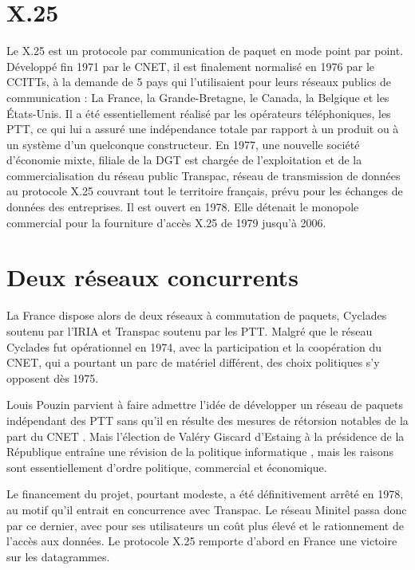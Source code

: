 \documentclass[12pt]{report}
\begin{document}
\section{X.25}

Le X.25 est un protocole par communication de paquet en mode point par point\cite{wikix25}. Développé fin 1971 par le \gls{CNET}, il est finalement normalisé en 1976 par le \glspl{CCITT}, à la demande de 5 pays qui l'utilisaient pour leurs réseaux publics de communication : La France, la Grande-Bretagne, le Canada, la Belgique et les États-Unis. Il a été essentiellement réalisé par les opérateurs téléphoniques, les \gls{PTT}, ce qui lui a assuré une indépendance totale par rapport à un produit ou à un système d'un quelconque constructeur. En 1977, une nouvelle société d'économie mixte, filiale de la DGT est chargée de l'exploitation et de la commercialisation du réseau public Transpac, réseau de transmission de données au protocole X.25 couvrant tout le territoire français, prévu pour les échanges de données des entreprises. Il est ouvert en 1978. Elle détenait le monopole commercial pour la fourniture d'accès X.25 de 1979 jusqu'à 2006\cite{wikitranspac}.

\section{Deux réseaux concurrents}

La France dispose alors de deux réseaux à commutation de paquets, Cyclades soutenu par l'IRIA et Transpac soutenu par les PTT. Malgré que le réseau Cyclades fut opérationnel en 1974, avec la participation et la coopération du CNET, qui a pourtant un parc de matériel différent, des choix politiques s'y opposent dès 1975.

Louis Pouzin parvient à faire admettre l'idée de développer un réseau de paquets indépendant des PTT \og sans qu'il en résulte des mesures de rétorsion notables de la part du CNET \fg. Mais l'élection de Valéry Giscard d'Estaing à la présidence de la République entraîne \og une révision de la politique informatique \fg, mais les raisons sont essentiellement d'ordre politique, commercial et économique.

Le financement du projet, pourtant modeste, a été définitivement arrêté en 1978, au motif qu'il entrait en concurrence avec Transpac. Le réseau Minitel passa donc par ce dernier, avec pour ses utilisateurs un coût plus élevé et le rationnement de l'accès aux données. Le protocole X.25 remporte d'abord en France une victoire sur les datagrammes\cite{wikicyc}.
\end{document}

